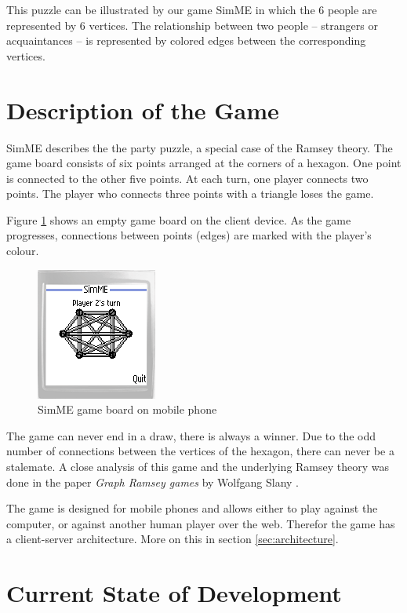		This puzzle can be illustrated by our game SimME in which the 6 people
		are represented by 6 vertices. The relationship between two people --
		strangers or acquaintances -- is represented by colored edges between
		the corresponding vertices.


\section{Description of the Game}

	SimME describes the the party puzzle, a special case of the Ramsey theory.
	The game board consists of six points arranged at the corners of a hexagon.
	One point is connected to the other five points. At each turn, one player
	connects two points. The player who connects three points with a triangle
	loses the game.

	Figure \ref{fig:gameboard} shows an empty game board on the client device.
	As the game progresses, connections between points (edges) are marked with
	the player's colour.

	\begin{figure}[h]
	\begin{center}
		\includegraphics{pics/simme-screen.png}
		\caption{SimME game board on mobile phone}
		\label{fig:gameboard}
	\end{center}
	\end{figure}

	The game can never end in a draw, there is always a winner. Due to the
	odd number of connections between the vertices of the hexagon, there can
	never be a stalemate. A close analysis of this game and the underlying
	Ramsey theory was done in the paper \emph{Graph Ramsey games} by
	Wolfgang Slany \cite{slany_paper}.

	The game is designed for mobile phones and allows either to play against
	the computer, or against another human player over the web. Therefor the
	game has a client-server architecture. More on this in section
	\ref{sec:architecture}.


\section{Current State of Development}

